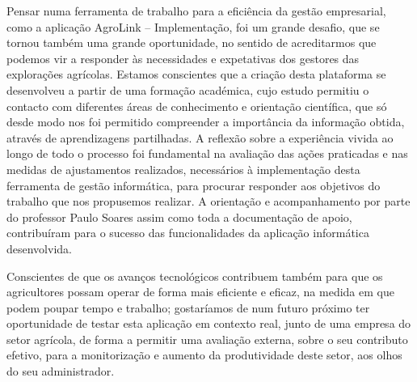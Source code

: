 \documentclass[a4paper,12pt]{report}
\begin{document}
	Pensar numa ferramenta de trabalho para a eficiência da gestão empresarial, como a aplicação AgroLink – Implementação, foi um grande desafio, que se tornou também uma grande oportunidade, no sentido de acreditarmos que podemos vir a responder às necessidades e expetativas dos gestores das explorações agrícolas. Estamos conscientes que a criação desta plataforma se desenvolveu a partir de uma formação académica, cujo estudo permitiu o contacto com diferentes áreas de conhecimento e orientação científica, que só desde modo nos foi permitido compreender a importância da informação obtida, através de aprendizagens partilhadas. A reflexão sobre a experiência vivida ao longo de todo o processo foi fundamental na avaliação das ações praticadas e nas medidas de ajustamentos realizados, necessários à implementação desta ferramenta de gestão informática, para procurar responder aos objetivos do trabalho que nos propusemos realizar. A orientação e acompanhamento por parte do professor Paulo Soares assim como toda a documentação de apoio, contribuíram para o sucesso das  funcionalidades da aplicação informática desenvolvida.
	
	Conscientes de que os avanços tecnológicos contribuem também para que os agricultores possam operar de forma mais eficiente e eficaz, na medida em que podem poupar tempo e trabalho; gostaríamos de num futuro próximo ter oportunidade de testar esta aplicação em contexto real, junto de uma empresa do setor agrícola, de forma a permitir uma avaliação externa, sobre o seu contributo efetivo, para a monitorização e aumento da produtividade deste setor, aos olhos do seu administrador.

	
\end{document}
